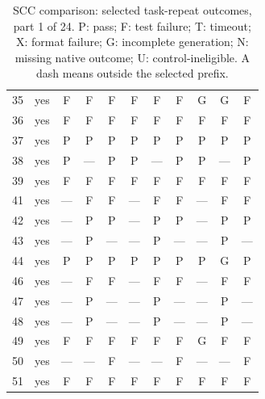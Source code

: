 \begin{table}[p]
\begin{tabular*}{\textwidth}{@{\extracolsep{\fill}}rc*{9}{c}@{}}
35 & yes & F & F & F & F & F & F & G & G & F\\
36 & yes & F & F & F & F & F & F & F & F & F\\
37 & yes & P & P & P & P & P & P & P & P & P\\
38 & yes & P & — & P & P & — & P & P & — & P\\
39 & yes & F & F & F & F & F & F & F & F & F\\
41 & yes & — & F & F & — & F & F & — & F & F\\
42 & yes & — & P & P & — & P & P & — & P & P\\
43 & yes & — & P & — & — & P & — & — & P & —\\
44 & yes & P & P & P & P & P & P & P & G & P\\
46 & yes & — & F & F & — & F & F & — & F & F\\
47 & yes & — & P & — & — & P & — & — & P & —\\
48 & yes & — & P & — & — & P & — & — & P & —\\
49 & yes & F & F & F & F & F & F & G & F & F\\
50 & yes & — & — & F & — & — & F & — & — & F\\
51 & yes & F & F & F & F & F & F & F & F & F\\
\bottomrule\end{tabular*}
\caption{SCC comparison: selected task-repeat outcomes, part 1 of 24. P: pass; F: test failure; T: timeout; X: format failure; G: incomplete generation; N: missing native outcome; U: control-ineligible. A dash means outside the selected prefix.}
\end{table}
\clearpage
